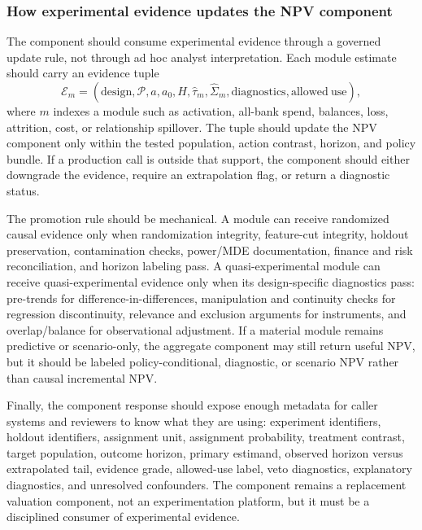\documentclass[11pt]{article}
\newcommand{\1}{\mathbf{1}}
\begin{document}
\subsubsection{How experimental evidence updates the NPV component}

The component should consume experimental evidence through a governed update
rule, not through ad hoc analyst interpretation. Each module estimate should
carry an evidence tuple
\begin{equation}
  \mathcal{E}_{m}
  =
  (\mathrm{design},\mathcal{P},a,a_0,H,\widehat{\tau}_m,
   \widehat{\Sigma}_m,\mathrm{diagnostics},\mathrm{allowed\ use}),
  \label{eq:evidence-tuple}
\end{equation}
where $m$ indexes a module such as activation, all-bank spend, balances, loss,
attrition, cost, or relationship spillover. The tuple should update the NPV
component only within the tested population, action contrast, horizon, and
policy bundle. If a production call is outside that support, the component
should either downgrade the evidence, require an extrapolation flag, or return
a diagnostic status.

The promotion rule should be mechanical. A module can receive randomized
causal evidence only when randomization integrity, feature-cut integrity,
holdout preservation, contamination checks, power/MDE documentation, finance
and risk reconciliation, and horizon labeling pass. A quasi-experimental
module can receive quasi-experimental evidence only when its design-specific
diagnostics pass: pre-trends for difference-in-differences, manipulation and
continuity checks for regression discontinuity, relevance and exclusion
arguments for instruments, and overlap/balance for observational adjustment.
If a material module remains predictive or scenario-only, the aggregate
component may still return useful NPV, but it should be labeled
policy-conditional, diagnostic, or scenario NPV rather than causal incremental
NPV.

Finally, the component response should expose enough metadata for caller
systems and reviewers to know what they are using: experiment identifiers,
holdout identifiers, assignment unit, assignment probability, treatment
contrast, target population, outcome horizon, primary estimand, observed
horizon versus extrapolated tail, evidence grade, allowed-use label, veto
diagnostics, explanatory diagnostics, and unresolved confounders. The
component remains a replacement valuation component, not an experimentation
platform, but it must be a disciplined consumer of experimental evidence.
\end{document}
